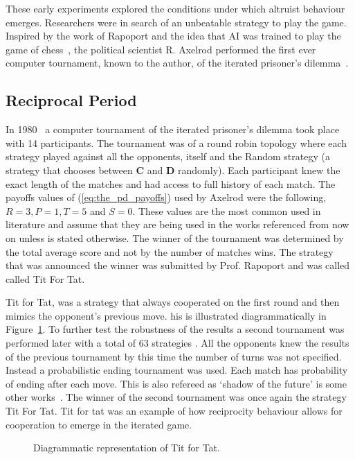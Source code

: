 \documentclass{article}
\begin{document}
These early experiments explored the conditions under which altruist behaviour
emerges. Researchers were in search of an unbeatable strategy to play the game. 
Inspired by the work of Rapoport and the idea that AI was trained to play the 
game of chess~\cite{axelrod2012}, the political scientist R. Axelrod performed
the first ever computer tournament, known to the author, of the iterated 
prisoner's dilemma~\cite{Axelrod1981}.

\subsection{Reciprocal Period}\label{subsection:reciprocal}
In 1980~\cite{axelrod1980a} a computer tournament of the iterated prisoner's 
dilemma took place with 14 participants. The tournament was of a round robin 
topology where each strategy played against all the opponents, itself and the 
Random strategy (a  strategy that chooses between \textbf{C} and \textbf{D}
randomly). Each
participant knew the exact length of the matches and had access to full history
of each match.  The payoffs values of (\ref{eq:the_pd_payoffs}) used by Axelrod
were the following, \(R=3, P=1, T=5\) and \(S=0\).  These values are the most 
common used in literature and assume that they are being used in the works 
referenced from now on unless is stated otherwise. The winner of the tournament 
was determined by the total average score and not by the number of matches 
wins. The strategy that was announced the winner was submitted by Prof. 
Rapoport and was called called Tit For Tat.

Tit for Tat, was a strategy that always cooperated on the first round and then
mimics the opponent's previous move. his is illustrated diagrammatically in 
Figure~\ref{fig:tit_for_tat_diagram}. To further test the robustness of the 
results a second tournament was performed later with a total of 63 strategies
\cite{axelrod1980b}. All the opponents knew the results of the previous 
tournament by this time the number of turns was not specified. Instead
a probabilistic ending tournament was used. Each match has probability of 
ending after each move. This is also refereed as `shadow of the future'
is some other works~\cite{axelrod1988}. The winner of the second tournament
was once again the strategy Tit For Tat. Tit for tat was an example of how reciprocity
behaviour allows for cooperation to emerge in the iterated game.

\begin{figure}[!hbtp]
    \centering
    
    \caption{Diagrammatic representation of Tit for Tat.}
    \label{fig:tit_for_tat_diagram}
\end{figure}
\end{document}
